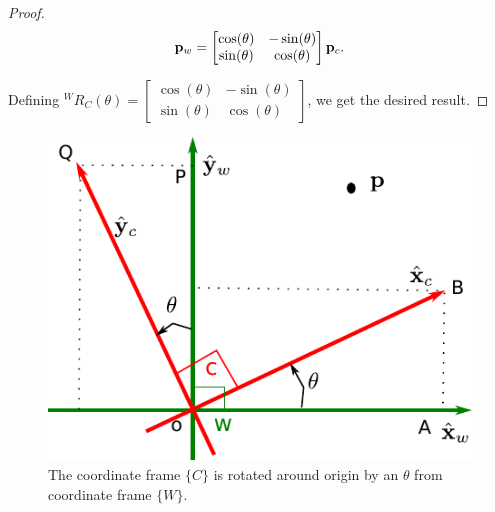 \documentclass{article}
\begin{document}
\begin{proof}
    \begin{align}
      \mathbf{p}_w = \begin{bmatrix} \cos(\theta) &  -\sin(\theta) \\
          \sin(\theta) &   \cos(\theta) \end{bmatrix} \mathbf{p}_c.
    \end{align}

    Defining ${}^WR_C(\theta) = \begin{bmatrix} \cos(\theta) &  -\sin(\theta) \\
      \sin(\theta) &   \cos(\theta) \end{bmatrix}$, we get the desired result.

    \end{proof}

\begin{figure}
\includegraphics[width=\linewidth]{media/rot-2D.pdf}
\caption{The coordinate  frame $\{C\}$  is rotated around origin by an $\theta$
  from coordinate  frame $\{W\}$.}
\label{fig:rot-2D}
\end{figure}
\end{document}
